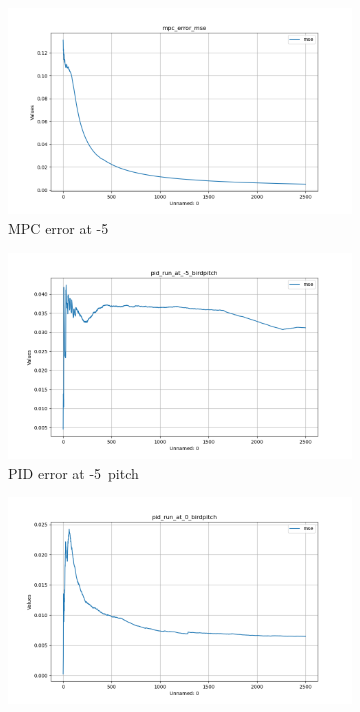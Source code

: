 \begin{figure}[h!]
    \centering
    \begin{subfigure}[b]{0.49\textwidth}
        \centering
        \includegraphics[width=\textwidth]{./img/mpc_error_mse.png}
        \caption{MPC error at -5\textdegree\ }
    \end{subfigure}
    \begin{subfigure}[b]{0.49\textwidth}
        \centering
        \includegraphics[width=\textwidth]{./img/pid_run_at_-5_birdpitch.png}
    \caption{PID error at -5\textdegree\ pitch}
    \end{subfigure}
    \begin{subfigure}[b]{0.49\textwidth}
        \centering
        \includegraphics[width=\textwidth]{./img/pid_run_at_0_birdpitch.png}

\end{subfigure}
\end{figure}
